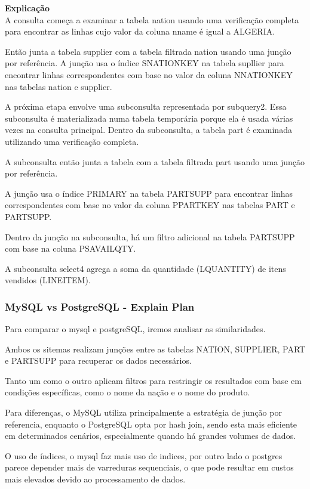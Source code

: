 \documentclass{article}
\begin{document}
\textbf{Explicação}\\
A consulta começa a examinar a tabela nation usando uma verificação completa para encontrar as linhas cujo valor da coluna n\underline{}name é igual a ALGERIA.

Então junta a tabela supplier com a tabela filtrada nation usando uma junção por referência. A junção usa o índice S\underline{}NATIONKEY na tabela supllier para encontrar linhas correspondentes com base no valor da coluna N\underline{}NATIONKEY nas tabelas nation e supplier.

A próxima etapa envolve uma subconsulta representada por subquery2. Essa subconsulta é materializada numa tabela temporária porque ela é usada várias vezes na consulta principal. Dentro da subconsulta, a tabela part é examinada utilizando uma verificação completa.

A subconsulta então junta a tabela com a tabela filtrada part usando uma junção por referência.

A junção usa o índice PRIMARY na tabela PARTSUPP para encontrar linhas correspondentes com base no valor da coluna P\underline{}PARTKEY nas tabelas PART e PARTSUPP.

Dentro da junção na subconsulta, há um filtro adicional na tabela PARTSUPP com base na coluna PS\underline{}AVAILQTY.

A subconsulta select4 agrega a soma da quantidade (L\underline{}QUANTITY) de itens vendidos (LINEITEM).

\subsubsection{MySQL vs PostgreSQL - Explain Plan}

Para comparar o mysql e postgreSQL, iremos analisar as similaridades.

Ambos os sitemas realizam junções entre as tabelas NATION, SUPPLIER, PART e PARTSUPP para recuperar os dados necessários.

Tanto um como o outro aplicam filtros para restringir os resultados com base em condições específicas, como o nome da nação e o nome do produto.

Para diferenças, o MySQL utiliza principalmente a estratégia de junção por referencia, enquanto o PostgreSQL opta por hash join, sendo esta mais eficiente em determinados cenários, especialmente quando há grandes volumes de dados.

O uso de índices, o mysql faz mais uso de indices, por outro lado o postgres parece depender mais de varreduras sequenciais, o que pode resultar em custos mais elevados devido ao processamento de dados.
\end{document}
